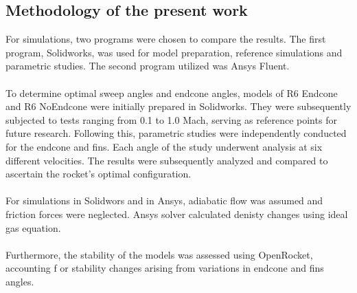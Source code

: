 \documentclass{article}
\begin{document}

\subsection{Methodology of the present work}
For simulations, two programs were chosen to compare the results. The first program, 
Solidworks, was used for model preparation, reference simulations and parametric studies. The second 
program utilized was Ansys Fluent.\\\\
To determine optimal sweep angles and endcone angles, models of R6 Endcone and R6 NoEndcone were 
initially prepared in Solidworks. They were subsequently subjected to tests ranging from 0.1 to 1.0 
Mach, serving as reference points for future research. Following this, parametric studies were 
independently conducted for the endcone and fins. Each angle of the study underwent analysis at 
six different velocities. The results were subsequently analyzed and compared to ascertain the 
rocket's optimal configuration.\\\\
For simulations in Solidwors and in Ansys, adiabatic flow was assumed and friction forces were
neglected. Ansys solver calculated denisty changes using ideal gas equation.\\\\
Furthermore, the stability of the models was assessed using OpenRocket, accounting f
or stability changes arising from variations in endcone and fins angles.
\end{document}
